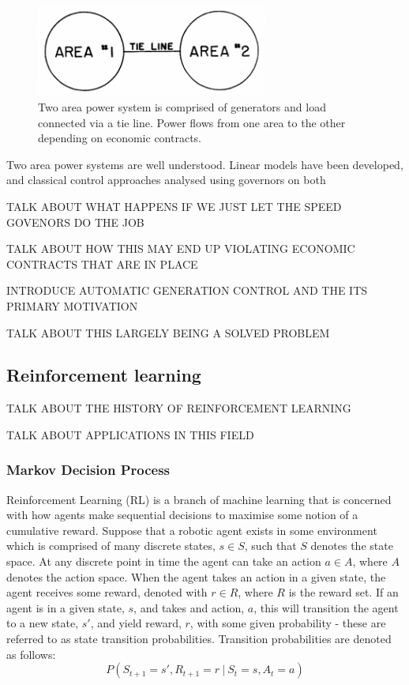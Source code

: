 \documentclass[12pt, a4paper]{article}
\begin{document}
\begin{figure}[h]
	\centering
	\includegraphics[height=3cm]{two_area_system}
	\caption{Two area power system is comprised of generators and load connected via a tie line. Power flows from one area to the other depending on economic contracts.}
\end{figure}

Two area power systems are well understood. Linear models have been developed, and classical control approaches analysed using governors on both

TALK ABOUT WHAT HAPPENS IF WE JUST LET THE SPEED GOVENORS DO THE JOB

TALK ABOUT HOW THIS MAY END UP VIOLATING ECONOMIC CONTRACTS THAT ARE IN PLACE

INTRODUCE AUTOMATIC GENERATION CONTROL AND THE ITS PRIMARY MOTIVATION

TALK ABOUT THIS LARGELY BEING A SOLVED PROBLEM

\subsection{Reinforcement learning}

TALK ABOUT THE HISTORY OF REINFORCEMENT LEARNING

TALK ABOUT APPLICATIONS IN THIS FIELD

\subsubsection{Markov Decision Process}
Reinforcement Learning (RL) is a branch of machine learning that is concerned with how agents make sequential decisions to maximise some notion of a cumulative reward. Suppose that a robotic agent exists in some environment which is comprised of many discrete states, $s \in S$, such that $S$ denotes the state space. At any discrete point in time the agent can take an action $a \in A$, where $A$ denotes the action space. When the agent takes an action in a given state, the agent receives some reward, denoted with $r \in R$, where $R$ is the reward set. If an agent is in a given state, $s$, and takes and action, $a$, this will transition the agent to a new state, $s'$, and yield reward, $r$, with some given probability - these are referred to as state transition probabilities. Transition probabilities are denoted as follows:
\begin{equation}
P(S_{t+1}=s', R_{t+1}=r \ | \ S_t = s, A_t = a)
\end{equation}
\end{document}
